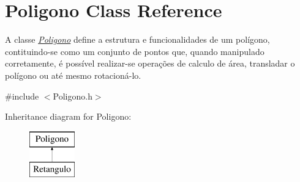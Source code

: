 \hypertarget{class_poligono}{}\section{Poligono Class Reference}
\label{class_poligono}


A classe {\itshape \hyperlink{class_poligono}{Poligono}} define a estrutura e funcionalidades de um polígono, contituindo-\/se como um conjunto de pontos que, quando manipulado corretamente, é possível realizar-\/se operações de calculo de área, transladar o polígono ou até mesmo rotacioná-\/lo.  




{\ttfamily \#include $<$Poligono.\+h$>$}

Inheritance diagram for Poligono\+:\begin{figure}[H]
\begin{center}
\leavevmode
\includegraphics[height=2.000000cm]{class_poligono}
\end{center}
\end{figure}

